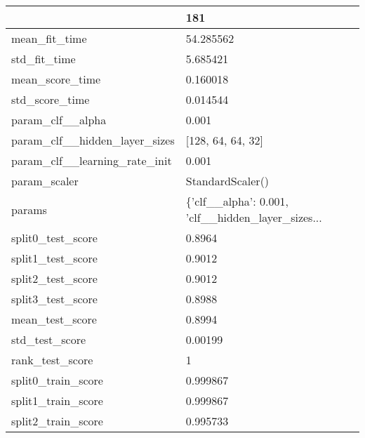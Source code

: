 \begin{tabular}{ll}
\toprule
{} &                                                181 \\
\midrule
mean\_fit\_time                 &                                          54.285562 \\
std\_fit\_time                  &                                           5.685421 \\
mean\_score\_time               &                                           0.160018 \\
std\_score\_time                &                                           0.014544 \\
param\_clf\_\_alpha              &                                              0.001 \\
param\_clf\_\_hidden\_layer\_sizes &                                  [128, 64, 64, 32] \\
param\_clf\_\_learning\_rate\_init &                                              0.001 \\
param\_scaler                  &                                   StandardScaler() \\
params                        &  \{'clf\_\_alpha': 0.001, 'clf\_\_hidden\_layer\_sizes... \\
split0\_test\_score             &                                             0.8964 \\
split1\_test\_score             &                                             0.9012 \\
split2\_test\_score             &                                             0.9012 \\
split3\_test\_score             &                                             0.8988 \\
mean\_test\_score               &                                             0.8994 \\
std\_test\_score                &                                            0.00199 \\
rank\_test\_score               &                                                  1 \\
split0\_train\_score            &                                           0.999867 \\
split1\_train\_score            &                                           0.999867 \\
split2\_train\_score            &                                           0.995733 \\

\end{tabular}
